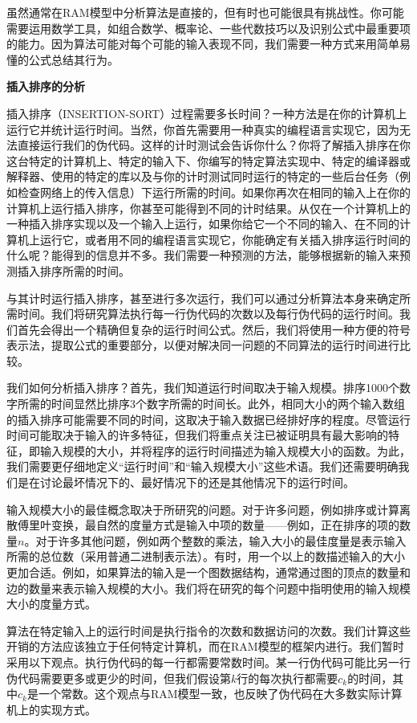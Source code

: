 \documentclass[lang=cn,newtx,10pt,scheme=chinese]{elegantbook}
\begin{document}
虽然通常在RAM模型中分析算法是直接的，但有时也可能很具有挑战性。你可能需要运用数学工具，如组合数学、概率论、一些代数技巧以及识别公式中最重要项的能力。因为算法可能对每个可能的输入表现不同，我们需要一种方式来用简单易懂的公式总结其行为。

\textbf{插入排序的分析}

插入排序（INSERTION-SORT）过程需要多长时间？一种方法是在你的计算机上运行它并统计运行时间。当然，你首先需要用一种真实的编程语言实现它，因为无法直接运行我们的伪代码。这样的计时测试会告诉你什么？你将了解插入排序在你这台特定的计算机上、特定的输入下、你编写的特定算法实现中、特定的编译器或解释器、使用的特定的库以及与你的计时测试同时运行的特定的一些后台任务（例如检查网络上的传入信息）下运行所需的时间。如果你再次在相同的输入上在你的计算机上运行插入排序，你甚至可能得到不同的计时结果。从仅在一个计算机上的一种插入排序实现以及一个输入上运行，如果你给它一个不同的输入、在不同的计算机上运行它，或者用不同的编程语言实现它，你能确定有关插入排序运行时间的什么呢？能得到的信息并不多。我们需要一种预测的方法，能够根据新的输入来预测插入排序所需的时间。

与其计时运行插入排序，甚至进行多次运行，我们可以通过分析算法本身来确定所需时间。我们将研究算法执行每一行伪代码的次数以及每行伪代码的运行时间。我们首先会得出一个精确但复杂的运行时间公式。然后，我们将使用一种方便的符号表示法，提取公式的重要部分，以便对解决同一问题的不同算法的运行时间进行比较。

我们如何分析插入排序？首先，我们知道运行时间取决于输入规模。排序1000个数字所需的时间显然比排序3个数字所需的时间长。此外，相同大小的两个输入数组的插入排序可能需要不同的时间，这取决于输入数据已经排好序的程度。尽管运行时间可能取决于输入的许多特征，但我们将重点关注已被证明具有最大影响的特征，即输入规模的大小，并将程序的运行时间描述为输入规模大小的函数。为此，我们需要更仔细地定义``运行时间''和``输入规模大小''这些术语。我们还需要明确我们是在讨论最坏情况下的、最好情况下的还是其他情况下的运行时间。

输入规模大小的最佳概念取决于所研究的问题。对于许多问题，例如排序或计算离散傅里叶变换，最自然的度量方式是输入中项的数量——例如，正在排序的项的数量$n$。对于许多其他问题，例如两个整数的乘法，输入大小的最佳度量是表示输入所需的总位数（采用普通二进制表示法）。有时，用一个以上的数描述输入的大小更加合适。例如，如果算法的输入是一个图数据结构，通常通过图的顶点的数量和边的数量来表示输入规模的大小。我们将在研究的每个问题中指明使用的输入规模大小的度量方式。

算法在特定输入上的运行时间是执行指令的次数和数据访问的次数。我们计算这些开销的方法应该独立于任何特定计算机，而在RAM模型的框架内进行。我们暂时采用以下观点。执行伪代码的每一行都需要常数时间。某一行伪代码可能比另一行伪代码需要更多或更少的时间，但我们假设第$k$行的每次执行都需要$c_k$的时间，其中$c_k$是一个常数。这个观点与RAM模型一致，也反映了伪代码在大多数实际计算机上的实现方式。
\end{document}
